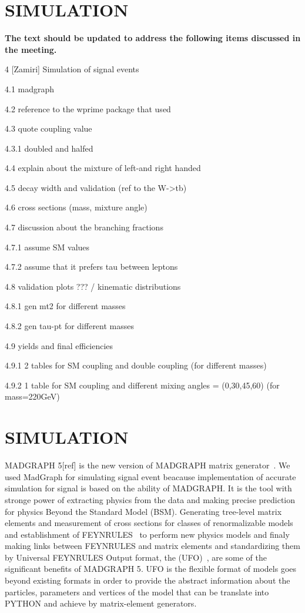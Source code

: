 \section{SIMULATION}\label{sec:evo}

{\bf The text should be updated to address the following items discussed in the meeting.}

4 [Zamiri] Simulation of signal events

4.1 madgraph

4.2 reference to the wprime package that used

4.3 quote coupling value

4.3.1 doubled and halfed

4.4 explain about the mixture of left-and right handed

4.5 decay width and validation (ref to the W->tb)

4.6 cross sections (mass, mixture angle)

4.7 discussion about the branching fractions

4.7.1 assume SM values

4.7.2 assume that it prefers tau between leptons

4.8 validation plots ??? / kinematic distributions

4.8.1 gen mt2 for different masses

4.8.2 gen tau-pt for different masses

4.9 yields and final efficiencies

4.9.1 2 tables for SM coupling and double coupling (for different masses)

4.9.2 1 table for SM coupling and different mixing angles = (0,30,45,60) (for mass=220GeV)

\section{SIMULATION}\label{sec:evo}
  {\small MADGRAPH 5}[ref] is the new version of {\small MADGRAPH} matrix generator~\cite{Alwall:2011uj}. We used MadGraph for simulating signal event beacause implementation of accurate simulation for signal is based on the ability of {\small MADGRAPH}. It is the tool with stronge power of extracting physics from the data and making precise prediction for physics Beyond the Standard Model {\small (BSM)}. Generating tree-level matrix elements and measurement of cross sections for classes of renormalizable models and establishment of {\small FEYNRULES}~\cite{Christensen:2008py} to perform new physics models and finaly making links between {\small FEYNRULES} and matrix elements and standardizing them by Universal F{\small EYNRULES} Output format, the {\small (UFO)}~\cite{Degrande:2011ua}, are some of the significant benefits of {\small MADGRAPH 5}. {\small UFO} is the flexible format of models goes beyond existing formats in order to provide the abstract information about the particles, parameters and vertices of the model that can be translate into {\small PYTHON} and achieve by matrix-element generators. 
 
